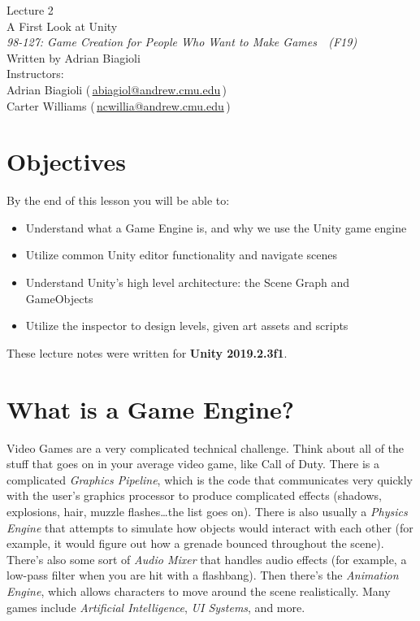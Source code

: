 \documentclass[11pt]{article}
\makeatletter
\newcommand{\lecturenum}{2}
\newcommand{\lecturename}{A First Look at Unity}
\newcommand{\authorname}{Adrian Biagioli}
\newcommand{\coursenum}{98-127}
\newcommand{\coursename}{Game Creation for People Who Want to Make Games}
\newcommand{\coursesem}{F19}
\newcommand{\instructors}{Adrian Biagioli (\,\href{mailto:abiagiol@andrew.cmu.edu}{abiagiol@andrew.cmu.edu}\,) \\ Carter Williams (\,\href{mailto:ncwillia@andrew.cmu.edu}{ncwillia@andrew.cmu.edu}\,)}
\makeatother
\begin{document}
\thispagestyle{plain}
{
    \vspace{1.5em}
    \begin{center}
    {
        \huge
        Lecture \lecturenum \\
        \vspace{0.5em}
        \lecturename
        \vspace{0.4em}
    } \\
    {
        \it
        \coursenum: \coursename\ \ (\coursesem)
    } \\
    \vspace{1.0em}
    Written by \authorname \\
    \vspace{0.7em}
    Instructors:\\ \instructors
    \end{center}
}

\section{Objectives}

By the end of this lesson you will be able to:
\begin{itemize}
    \item Understand what a Game Engine is, and why we use the Unity game engine
    \item Utilize common Unity editor functionality and navigate scenes
    \item Understand Unity's high level architecture: the Scene Graph and GameObjects
    \item Utilize the inspector to design levels, given art assets and scripts
\end{itemize}

\noindent These lecture notes were written for {\bf Unity 2019.2.3f1}.

\section{What is a Game Engine?}

\par Video Games are a very complicated technical challenge.  Think about all of the stuff that goes on in your average video game, like Call of Duty.  There is a complicated {\it Graphics Pipeline}, which is the code that communicates very quickly with the user's graphics processor to produce complicated effects (shadows, explosions, hair, muzzle flashes\dots the list goes on).  There is also usually a {\it Physics Engine} that attempts to simulate how objects would interact with each other (for example, it would figure out how a grenade bounced throughout the scene).  There's also some sort of {\it Audio Mixer} that handles audio effects (for example, a low-pass filter when you are hit with a flashbang).  Then there's the {\it Animation Engine}, which allows characters to move around the scene realistically.  Many games include {\it Artificial Intelligence}, {\it UI Systems}, and more.
\end{document}

